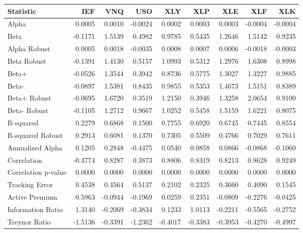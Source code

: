 \begin{tabular}{lrrrrrrrr}
\toprule
Statistic & IEF & VNQ & USO & XLY & XLP & XLE & XLF & XLK \\
\midrule
Alpha & 0.0005 & 0.0010 & -0.0024 & 0.0002 & 0.0003 & 0.0003 & -0.0004 & -0.0004 \\
Beta & -0.1171 & 1.5139 & 0.4982 & 0.9785 & 0.5435 & 1.2646 & 1.5142 & 0.9235 \\
Alpha Robust & 0.0005 & 0.0018 & -0.0035 & 0.0008 & 0.0007 & 0.0006 & -0.0018 & -0.0003 \\
Beta Robust & -0.1391 & 1.4130 & 0.5157 & 1.0993 & 0.5312 & 1.2976 & 1.6308 & 0.8998 \\
Beta+ & -0.0526 & 1.3544 & 0.3942 & 0.8736 & 0.5775 & 1.3027 & 1.3227 & 0.9885 \\
Beta- & -0.0897 & 1.5381 & 0.8435 & 0.9855 & 0.5353 & 1.4673 & 1.5151 & 0.8389 \\
Beta+ Robust & -0.0695 & 1.6720 & 0.3519 & 1.2150 & 0.3946 & 1.3258 & 2.0654 & 0.9100 \\
Beta- Robust & -0.1105 & 1.2712 & 0.9667 & 1.0252 & 0.5458 & 1.5159 & 1.6221 & 0.8075 \\
R-squared & 0.2279 & 0.6868 & 0.1500 & 0.7755 & 0.6920 & 0.6745 & 0.7445 & 0.8554 \\
R-squared Robust & 0.2913 & 0.6081 & 0.1370 & 0.7305 & 0.5509 & 0.4766 & 0.7029 & 0.7611 \\
Annualized Alpha & 0.1205 & 0.2848 & -0.4475 & 0.0540 & 0.0858 & 0.0866 & -0.0868 & -0.1060 \\
Correlation & -0.4774 & 0.8287 & 0.3873 & 0.8806 & 0.8319 & 0.8213 & 0.8628 & 0.9249 \\
Correlation p-value & 0.0000 & 0.0000 & 0.0000 & 0.0000 & 0.0000 & 0.0000 & 0.0000 & 0.0000 \\
Tracking Error & 0.4538 & 0.4564 & 0.5137 & 0.2102 & 0.2325 & 0.3660 & 0.4090 & 0.1545 \\
Active Premium & 0.5963 & -0.0944 & -0.1969 & 0.0259 & 0.2351 & -0.0809 & -0.2276 & -0.0425 \\
Information Ratio & 1.3140 & -0.2069 & -0.3834 & 0.1233 & 1.0113 & -0.2211 & -0.5565 & -0.2752 \\
Treynor Ratio & -1.5136 & -0.3391 & -1.2362 & -0.4017 & -0.3383 & -0.3953 & -0.4270 & -0.4997 \\
\bottomrule
\end{tabular}
